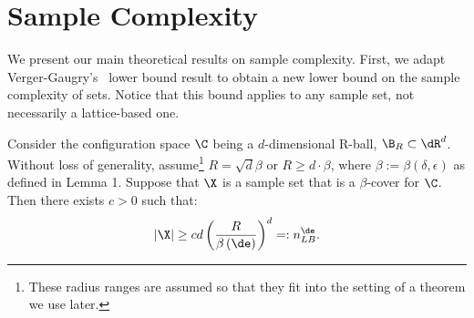 \section{Sample Complexity}\label{sec:sample_comlpexity}
We present our main theoretical results on sample complexity. First, we adapt Verger-Gaugry's~\cite{verger2005covering} lower bound result to obtain a new lower bound on the sample complexity of \decomp sets. Notice that this bound applies to any sample set, not necessarily a lattice-based one.

\begin{thm}
    Consider the configuration space $\C$ being a $d$-dimensional R-ball, $\B_R\subset \dR^d$. Without loss of generality, assume\footnote{These radius ranges are assumed so that they fit into the setting of a theorem we use later.} $R=\sqrt{d}\beta$ or $R\geq d\cdot\beta$, where $\beta:=\beta\left(\delta,\epsilon\right)$ as defined in Lemma 1. Suppose that $\X$ is a sample set that is a $\beta$-cover for $\C$. Then there exists $c>0$ such that:
    \[
        |\X|\geq cd\left(\frac{R}{\beta\left(\de\right)}\right)^d =: n_{LB}^{\de}.
    \]
\end{thm}
